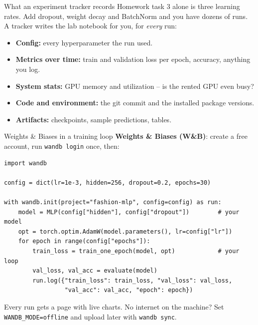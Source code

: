 \documentclass[aspectratio=43]{beamer}
\begin{document}
\begin{frame}{What an experiment tracker records}
  \small
  Homework task 3 alone is three learning rates. Add dropout, weight decay and BatchNorm and you
  have dozens of runs. A tracker writes the lab notebook for you, for \emph{every} run:
  \vfill
  \begin{itemize}\small
    \item \textbf{Config:} every hyperparameter the run used.
    \item \textbf{Metrics over time:} train and validation loss per epoch, accuracy, anything you log.
    \item \textbf{System stats:} GPU memory and utilization -- is the rented GPU even busy?
    \item \textbf{Code and environment:} the git commit and the installed package versions.
    \item \textbf{Artifacts:} checkpoints, sample predictions, tables.
  \end{itemize}
  \vfill
\end{frame}

\begin{frame}[fragile]{Weights \& Biases in a training loop}
  \small
  \textbf{Weights \& Biases (W\&B)}: create a free account, run \texttt{wandb login} once, then:
  \vskip 2pt
\begin{lstlisting}
import wandb

config = dict(lr=1e-3, hidden=256, dropout=0.2, epochs=30)

with wandb.init(project="fashion-mlp", config=config) as run:
    model = MLP(config["hidden"], config["dropout"])        # your model
    opt = torch.optim.AdamW(model.parameters(), lr=config["lr"])
    for epoch in range(config["epochs"]):
        train_loss = train_one_epoch(model, opt)            # your loop
        val_loss, val_acc = evaluate(model)
        run.log({"train_loss": train_loss, "val_loss": val_loss,
                 "val_acc": val_acc, "epoch": epoch})
\end{lstlisting}
  \vfill
  {\footnotesize Every run gets a page with live charts. No internet on the machine? Set
  \texttt{WANDB\_MODE=offline} and upload later with \texttt{wandb sync}.}
\end{frame}
\end{document}
